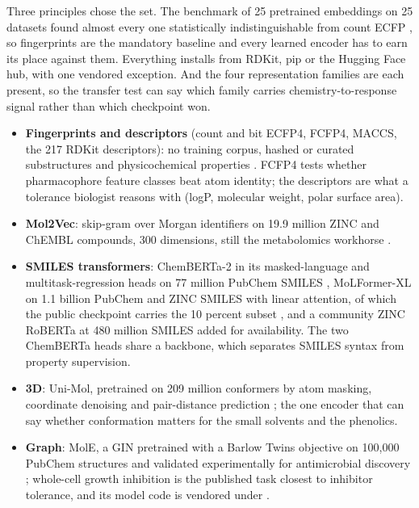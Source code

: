 Three principles chose the set. The benchmark of 25 pretrained embeddings on 25
datasets found almost every one statistically indistinguishable from count ECFP
, so fingerprints are the mandatory
baseline and every learned encoder has to earn its place against them. Everything
installs from RDKit, pip or the Hugging Face hub, with one vendored exception. And the
four representation families are each present, so the transfer test can say which
family carries chemistry-to-response signal rather than which checkpoint won.
\begin{itemize}
\item \textbf{Fingerprints and descriptors} (count and bit ECFP4, FCFP4, MACCS, the 217
  RDKit descriptors): no training corpus, hashed or curated substructures and
  physicochemical properties . FCFP4 tests whether pharmacophore
  feature classes beat atom identity; the descriptors are what a tolerance biologist
  reasons with (logP, molecular weight, polar surface area).
\item \textbf{Mol2Vec}: skip-gram over Morgan identifiers on 19.9 million ZINC and ChEMBL
  compounds, 300 dimensions, still the metabolomics workhorse .
\item \textbf{SMILES transformers}: ChemBERTa-2 in its masked-language and
  multitask-regression heads on 77 million PubChem SMILES , MoLFormer-XL on 1.1 billion PubChem and ZINC SMILES with linear
  attention, of which the public checkpoint carries the 10 percent subset , and a community ZINC RoBERTa at
  480 million SMILES added for availability. The two ChemBERTa heads share a backbone,
  which separates SMILES syntax from property supervision.
\item \textbf{3D}: Uni-Mol, pretrained on 209 million conformers by atom masking,
  coordinate denoising and pair-distance prediction ;
  the one encoder that can say whether conformation matters for the small solvents
  and the phenolics.
\item \textbf{Graph}: MolE, a GIN pretrained with a Barlow Twins objective on 100{,}000
  PubChem structures and validated experimentally for antimicrobial discovery
  ; whole-cell
  growth inhibition is the published task closest to inhibitor tolerance, and its
  model code is vendored under .
\end{itemize}


